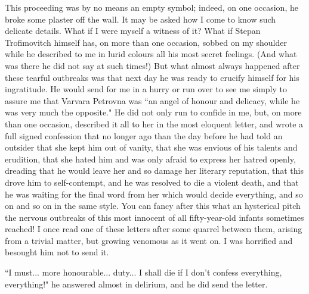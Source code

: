 \documentclass[12pt]{article}
\begin{document}
\vspace{12pt}
This proceeding was by no means an empty symbol; indeed, on one
occasion, he broke some plaster off the wall. It may be asked how I come
to know such delicate details. What if I were myself a witness of it?
What if Stepan Trofimovitch himself has, on more than one occasion,
sobbed on my shoulder while he described to me in lurid colours all his
most secret feelings. (And what was there he did not say at such times!)
But what almost always happened after these tearful outbreaks was that
next day he was ready to crucify himself for his ingratitude. He would
send for me in a hurry or run over to see me simply to assure me that
Varvara Petrovna was ``an angel of honour and delicacy, while he was very
much the opposite." He did not only run to confide in me, but, on more
than one occasion, described it all to her in the most eloquent letter,
and wrote a full signed confession that no longer ago than the day
before he had told an outsider that she kept him out of vanity, that
she was envious of his talents and erudition, that she hated him and was
only afraid to express her hatred openly, dreading that he would leave
her and so damage her literary reputation, that this drove him to
self-contempt, and he was resolved to die a violent death, and that he
was waiting for the final word from her which would decide everything,
and so on and so on in the same style. You can fancy after this what
an hysterical pitch the nervous outbreaks of this most innocent of
all fifty-year-old infants sometimes reached! I once read one of these
letters after some quarrel between them, arising from a trivial matter,
but growing venomous as it went on. I was horrified and besought him not
to send it.


\vspace{12pt}
``I must... more honourable... duty... I shall die if I don't confess
everything, everything!" he answered almost in delirium, and he did send
the letter.
\end{document}

